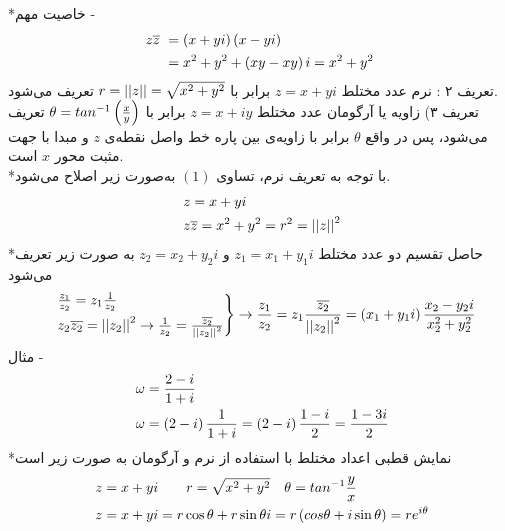 *خاصیت مهم -
\begin{equation}
	\begin{aligned}
		z\overline{z} &\ = \left(x+yi\right)\left(x-yi\right)
		\\ &\
		=x^2+y^2+\left(xy-xy\right)i=x^2+y^2
	\end{aligned}
\end{equation}
تعریف ۲ : نرم عدد مختلط
$z=x+yi$
برابر با
$r=\left|\left| z \right|\right|=\sqrt{x^2+y^2}$
تعریف می‌شود.\\
تعریف ۳) زاویه یا آرگومان عدد مختلط
$z=x+iy$
برابر با
$\theta=tan^{-1}\left(\frac x y\right)$
تعریف می‌شود، پس در واقع
$\theta$
برابر با زاویه‌ی بین پاره خط واصل نقطه‌ی
$z$
و مبدا با جهت مثبت محور
$x$
است.
\\
*با توجه به تعریف نرم، تساوی
$(1)$
به‌صورت زیر اصلاح می‌شود.
\begin{equation}
	\begin{aligned}
		&\ z=x+yi\\
		&\ z\overline{z}=x^2+y^2=r^2=\left|\left| z \right|\right|^2
	\end{aligned}
\end{equation}
*حاصل تقسیم دو عدد مختلط
$z_1=x_1+y_1i$
و
$z_2=x_2+y_2i$
به صورت زیر تعریف می‌شود
\begin{equation*}
	\begin{aligned}
		&\ \begin{rcases}
			&\ \frac{z_1}{z_2}=z_1\frac 1{z_2}
			\\
			&\ z_2\overline{z_2}=\left|\left| z_2 \right|\right|^2\rightarrow \frac1{z_2}=\frac{\overline{z_2}}{\left|\left| z_2 \right|\right|^2}
		\end{rcases}\rightarrow
		\frac{z_1}{z_2}=z_1\frac{\overline{z_2}}{\left|\left| z_2 \right|\right|^2}=\left(x_1+y_1i\right)\frac{x_2-y_2i}{x_2^2+y_2^2}
	\end{aligned}
\end{equation*}
مثال -
\begin{equation*}
	\begin{aligned}
		&\ \omega=\frac{2-i}{1+i}
		\\ &\
		\omega=\left(2-i\right)\frac1{1+i}=\left(2-i\right)\frac{1-i}{2}=\frac{1-3i}2
	\end{aligned}
\end{equation*}
*نمایش قطبی اعداد مختلط با استفاده از نرم و آرگومان به صورت زیر است
\begin{equation*}
	\begin{aligned}
		&\ z=x+yi \qquad r=\sqrt{x^2+y^2} \quad \theta=tan^{-1}\frac{y}{x}
		\\ &\
		z=x+yi=r \cos \theta + r\sin \theta i = r\left(cos \theta + i\sin \theta\right)=re^{i\theta}
	\end{aligned}
\end{equation*}
